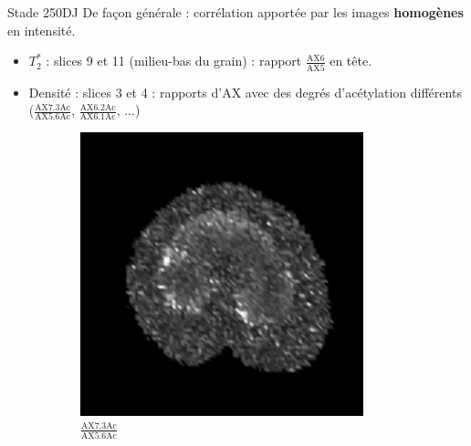 \documentclass[10pt]{beamer}
\begin{document}
\begin{frame}{Stade 250DJ}
  De façon générale : corrélation apportée par les images \textbf{homogènes} en intensité.

  \begin{itemize}
  \item  $T_2^*$ : slices 9 et 11 (milieu-bas du grain) : rapport $\frac{\text{AX6}}{\text{AX5}}$ en tête.
  \item   Densité : slices 3 et 4 : rapports d'AX avec des degrés d'acétylation différents ($\frac{\text{AX7.3Ac}}{\text{AX5.6Ac}}$, $\frac{\text{AX6.2Ac}}{\text{AX6.1Ac}}$, ...)
  \end{itemize}


  \begin{figure}[ht]
    \centering
    \begin{subfigure}[t]{0.33\textwidth}
      \centering
      \includegraphics[width=0.9\textwidth]{fig/density_250_slice3}
      \caption{$\frac{\text{AX7.3Ac}}{\text{AX5.6Ac}}$}
      \label{subfig:density_250_slice3}
    \end{subfigure}%
    \begin{subfigure}[t]{0.33\textwidth}
      \centering

\end{subfigure}
\end{figure}
\end{frame}
\end{document}
